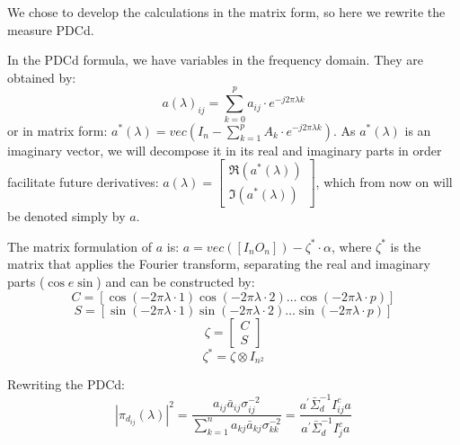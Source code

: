 \documentclass[a4paper,10pt]{article}
\begin{document}
We chose to develop the calculations in the matrix form, so here we rewrite the measure PDCd.

In the PDCd formula, we have variables in the frequency domain. They are obtained by:
\begin{equation}
a(\lambda)_{ij} = \sum_{k = 0}^{p} a_{ij} \cdot e^{-j2 \pi \lambda k}
\end{equation}
or in matrix form: $a^{\ast}(\lambda) = vec(I_{n} - \sum_{k=1}^{p} {A_{k} \cdot e^{-j2\pi\lambda k}})$. As $a^{\ast}(\lambda)$ is an imaginary vector, we will decompose it in its real and imaginary parts in order facilitate future derivatives: $a(\lambda) = \left[ \begin{array}{c} \Re(a^{\ast}(\lambda)) \\ \Im(a^{\ast}(\lambda)) \end{array} \right]$, which from now on will be denoted simply by $a$.

The matrix formulation of $a$ is:
$a = vec(\left[ I_{n} O_{n} \right]) - \zeta^{\ast} \cdot \alpha$, where $\zeta^{\ast}$ is the matrix that applies the Fourier transform, separating the real and imaginary parts ($\cos e \sin$) and can be constructed by:
\begin{equation}
C = [\cos(-2\pi\lambda \cdot 1) \cos(-2\pi\lambda \cdot 2) \dots \cos(-2\pi\lambda \cdot p)]
\end{equation}
\begin{equation}
S = \left[\sin(-2\pi\lambda \cdot 1) \sin(-2\pi\lambda \cdot 2) \dots \sin(-2\pi\lambda \cdot p)\right]
\end{equation}
\begin{equation}
\zeta = \left[\begin{array}{c} C \\ S \end{array} \right]
\end{equation}
\begin{equation}
\zeta^{\ast} = \zeta \otimes I_{n^{2}}
\end{equation}

Rewriting the PDCd:
\begin{equation} 
|\pi_{d_{ij}}(\lambda)|^{2} = \frac{a_{ij} \bar{a}_{ij} \sigma_{ij}^{-2}} {\sum_{k=1}^{n}{a_{kj} \bar{a}_{kj} \sigma_{kk}^{-2}}} = \frac{a^{'} \bar{\Sigma}_{d}^{-1} I_{ij}^{c} a}{a^{'} \bar{\Sigma}_{d}^{-1} I_{j}^{c} a}
\end{equation}
\end{document}
